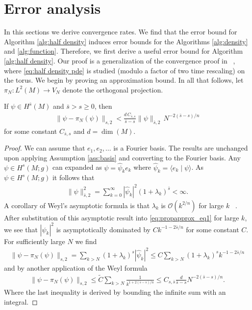 \documentclass[final,leqno]{siamart}
\begin{document}
\section{Error analysis} \label{sec:analysis}

In this sections we derive convergence rates.
We find that the error bound for Algorithm \ref{alg:half density} induces error bounds for the Algorithms \ref{alg:density} and \ref{alg:function}.
Therefore, we first derive a useful error bound for Algorithm \ref{alg:half density}.
Our proof is a generalization of the convergence proof in ~\cite{Pasciak1980}, where \eqref{eq:half density pde} is studied (modulo a factor of two time rescaling) on the torus.
We begin by proving an approximation bound.
In all that follows, let $\pi_{N}: L^{2}(M) \to V_{N}$ denote the orthogonal projection.

\begin{proposition} \label{prop:approximation}
	If $\psi \in H^{\bar{s}}(M)$ and $\bar{s} > s \geq 0$,
	then
	\begin{align}
		\| \psi - \pi_{N}(\psi) \|_{s,2} <  \frac{d \, C_{\bar{s},s} }{ \bar{s}-s} \| \psi \|_{\bar{s} , 2} \, N^{-2(\bar{s}-s)/n}
	\end{align}
	for some constant $C_{\bar{s},s}$ and $d = \dim(M)$.
\end{proposition}
\begin{proof}
	We can assume that $e_{1},e_{2},\dots$ is a Fourier basis.
	The results are unchanged upon applying Assumption \ref{ass:basis} and converting to the Fourier basis.
	Any $\psi \in H^{s}(M;g)$ can expanded as $\psi = \hat{\psi}_{k} e_{k}$ where $\hat{\psi}_{k} = \langle e_{k} \mid \psi \rangle$.
	As $\psi \in H^{s}(M;g)$ it follows that
	\begin{align}
		\| \psi \|^{2}_{\bar{s},2} = \sum_{k=0}^{\infty} \left| \hat{\psi}_{k} \right|^{2} (1+\lambda_{k})^{\bar{s}} < \infty.
		\label{eq:propapprox_eq1}
	\end{align}
	A corollary of Weyl's asymptotic formula is that $\lambda_{k}$ is $\mathcal{O}( k^{2/n})$ for large $k$ ~\cite[page 155]{Chavel1984}.
	After substitution of this asymptotic result into \eqref{eq:propapprox_eq1} for large $k$, we see that $|\hat{\psi}_{k}|^{2}$ is asymptotically dominated by  $C k^{-1- 2\bar{s}/n}$ for some constant $C$.
	For sufficiently large $N$ we find
	\begin{align}
		\| \psi - \pi_{N}(\psi) \|_{s,2} = \sum_{k>N} (1+\lambda_{k})^{s} |\hat{\psi}_{k}|^{2} \leq C \sum_{k>N} (1+\lambda_{k})^{s} k^{-1- 2\bar{s}/n}
	\end{align}
	and by another application of the Weyl formula
	\begin{align}
		\| \psi - \pi_{N}(\psi) \|_{s,2} \leq \tilde{C} \sum_{k>N} \frac{1}{k^{1+2(\bar{s}-s)/n}} \leq C_{s,\bar{s}}  \frac{d }{ \bar{s}-s} N^{-2(\bar{s}-s)/n}.
	\end{align}
	Where the last inequality is derived by bounding the infinite sum with an integral.
\end{proof}
\end{document}
